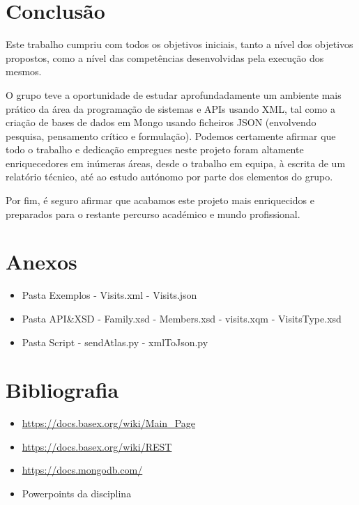 \documentclass{article}
\begin{document}
\newpage
\section{Conclusão}
\hspace{0.5cm} Este trabalho cumpriu com todos os objetivos iniciais, tanto a nível dos objetivos propostos, como a nível das competências desenvolvidas pela execução dos mesmos. \par
O grupo teve a oportunidade de estudar aprofundadamente um ambiente mais prático da área da programação de sistemas e APIs usando XML, tal como a criação de bases de dados em Mongo usando ficheiros JSON (envolvendo pesquisa, pensamento crítico e formulação).
Podemos certamente afirmar que todo o trabalho e dedicação empregues neste projeto foram altamente enriquecedores em inúmeras áreas, desde o trabalho em equipa, à escrita de um relatório técnico, até ao estudo autónomo por parte dos elementos do grupo. \par
Por fim, é seguro afirmar que acabamos este projeto mais enriquecidos e preparados para o restante percurso académico e mundo profissional. \par

\section{Anexos}
\begin{itemize}
    \item Pasta Exemplos
        \subitem - Visits.xml 
        \subitem - Visits.json 
    \item Pasta API&XSD
        \subitem - Family.xsd
        \subitem - Members.xsd
        \subitem - visits.xqm
        \subitem - VisitsType.xsd
    \item Pasta Script
        \subitem - sendAtlas.py
        \subitem - xmlToJson.py
\end{itemize}

\section{Bibliografia}
\begin{itemize}
    \item \url{https://docs.basex.org/wiki/Main_Page}
    \item \url{https://docs.basex.org/wiki/REST}
    \item \url{https://docs.mongodb.com/}
    \item Powerpoints da disciplina
\end{itemize}
\end{document}
